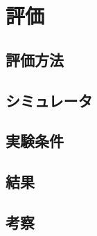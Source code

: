 \chapter{評価} \label{chapter:evaluate}

\section{評価方法}


\section{シミュレータ}


\section{実験条件}


\section{結果}


\section{考察}
